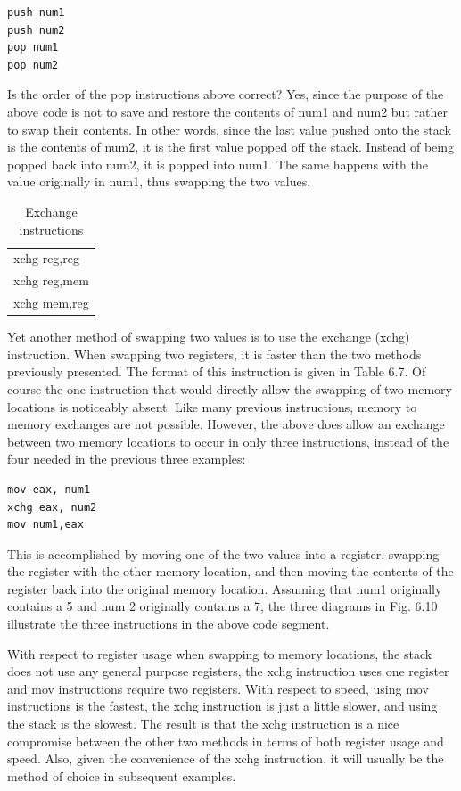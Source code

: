 \documentclass[10pt]{book}
\begin{document}
\begin{verbatim}
push num1
push num2
pop num1
pop num2
\end{verbatim}

Is the order of the pop instructions above correct? Yes, since the purpose of the above code is not to save and restore the contents of num1 and num2 but rather to swap their contents. In other words, since the last value pushed onto the stack is the contents of num2, it is the first value popped off the stack. Instead of being popped back into num2, it is popped into num1. The same happens with the value originally in num1, thus swapping the two values.

\begin{table}[ht]
\centering
\begin{tabular}{l}
xchg reg,reg\\
xchg reg,mem\\
xchg mem,reg
\end{tabular}
\caption{Exchange instructions}
\end{table}

Yet another method of swapping two values is to use the exchange (xchg) instruction. When swapping two registers, it is faster than the two methods previously presented. The format of this instruction is given in Table 6.7.
Of course the one instruction that would directly allow the swapping of two memory locations is noticeably absent. Like many previous instructions, memory to memory exchanges are not possible. However, the above does allow an exchange between two memory locations to occur in only three instructions, instead of the four needed in the previous three examples:

\begin{verbatim}
mov eax, num1
xchg eax, num2
mov num1,eax
\end{verbatim}

This is accomplished by moving one of the two values into a register, swapping the register with the other memory location, and then moving the contents of the register back into the original memory location. Assuming that num1 originally contains a 5 and num 2 originally contains a 7, the three diagrams in Fig. 6.10 illustrate the three instructions in the above code segment.

With respect to register usage when swapping to memory locations, the stack does not use any general purpose registers, the xchg instruction uses one register and mov instructions require two registers. With respect to speed, using mov instructions is the fastest, the xchg instruction is just a little slower, and using the stack is the slowest. The result is that the xchg instruction is a nice compromise between the other two methods in terms of both register usage and speed. Also, given the convenience of the xchg instruction, it will usually be the method of choice in subsequent examples.
\end{document}
